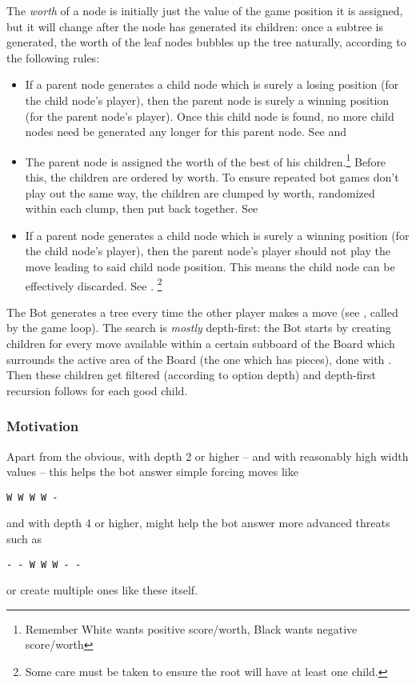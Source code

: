\documentclass[12pt,a4paper,notitlepage]{article}
\begin{document}
The \textit{worth} of a node is initially just the value of the game position it is assigned, but it will change after the node has generated its children: once a subtree is generated, the worth of the leaf nodes bubbles up the tree naturally, according to the following rules:
\begin{itemize}
\item If a parent node generates a child node which is surely a losing position (for the child node's player), then the parent node is surely a winning position (for the parent node's player). Once this child node is found, no more child nodes need be generated any longer for this parent node. See  and 
\item The parent node is assigned the worth of the best of his children.\footnote{Remember White wants positive score/worth, Black wants negative score/worth} Before this, the children are ordered by worth. To ensure repeated bot games don't play out the same way, the children are clumped by worth, randomized within each clump, then put back together. See 
\item If a parent node generates a child node which is surely a winning position (for the child node's player), then the parent node's player should not play the move leading to said child node position. This means the child node can be effectively discarded. See . \footnote{Some care must be taken to ensure the root will have at least one child.}
\end{itemize}

The Bot generates a tree every time the other player makes a move (see , called by the game loop).
The search is \textit{mostly} depth-first: the Bot starts by creating children for every move available within a certain subboard of the Board which surrounds the active area of the Board (the one which has pieces),
done with . Then these children get filtered (according to option depth) and depth-first recursion follows for each good child.

\subsubsection{Motivation}
\label{subsubsec:motivationbot}

Apart from the obvious, with depth 2 or higher -- and with reasonably high width values -- this helps the bot answer simple forcing moves like
\begin{center}
\tt W W W W -
\end{center}
and with depth 4 or higher, might help the bot answer more advanced threats such as
\begin{center}
\tt - - W W W - -
\end{center}
or create multiple ones like these itself.
\end{document}
